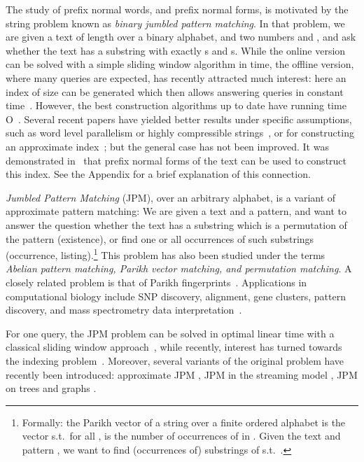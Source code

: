 \documentclass[11pt,a4paper]{llncs}
\begin{document}
The study of prefix normal words, and prefix normal forms, is motivated by the string problem known as {\em binary jumbled pattern matching}. In that problem, we are given a text of length  over a binary alphabet, and two numbers  and , and ask whether the text has a substring with exactly  s and  s. While the online version can be solved with a simple sliding window algorithm in  time, the offline version, where many queries are expected, has recently attracted much interest: here an index of size  can be generated which then allows answering queries in constant time~\cite{CFL09}. However, the best construction algorithms up to date have running time O~\cite{BCFL10,MR10}. Several recent papers have yielded better results under specific assumptions, such as word level parallelism or highly compressible strings~\cite{MR12,BFKL13,GG13,CGGLLRT13}, or for constructing an approximate index~\cite{CLWY12}; but the general case has not been improved. It was demonstrated in~\cite{FL11,BFKL13} that prefix normal forms of the text can be used to construct this index. See the Appendix for a brief explanation of this connection.

{\em Jumbled Pattern Matching} (JPM), over an arbitrary alphabet, is a variant of approximate pattern matching: We are given a text and a pattern, and want to answer the question whether the text has a substring which is a permutation of the pattern (existence), or find one or all occurrences of such substrings (occurrence, listing).\footnote{Formally: the Parikh vector of a string  over a finite ordered alphabet  is the vector  s.t.\ for all ,  is the number of occurrences of  in . Given the text  and pattern , we want to find (occurrences of) substrings  of  s.t.\ .}
This problem has also been studied under the terms {\em Abelian pattern matching, Parikh vector matching, and permutation matching}. A closely related problem is that of Parikh fingerprints~\cite{AALS03}.
Applications in computational biology include SNP discovery, alignment, gene clusters, pattern discovery, and mass spectrometry data interpretation~\cite{Boecker07,Benson03,BoeckerJMS08,DuhrkopLMB13,Parida06}. 

For one query, the JPM problem can be solved in optimal linear time with a classical sliding window approach~\cite{BEL04}, while recently, interest has turned towards the indexing problem~\cite{CFL09,KRR13}. Moreover, several variants of the original problem have recently been introduced: approximate JPM \cite{BCFL12_TOCS}, JPM in the streaming model \cite{LLZ12}, JPM on trees and graphs \cite{GHLW13,CGGLLRT13}. 
\end{document}
